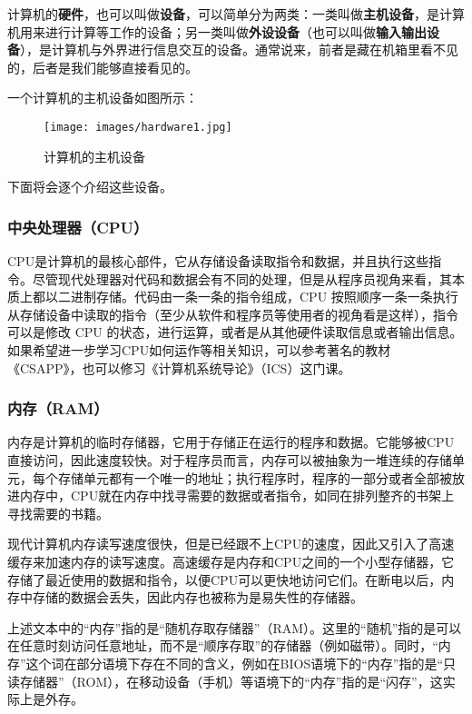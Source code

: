 \documentclass[../main.tex]{subfiles}
\begin{document}
计算机的\textbf{硬件}，也可以叫做\textbf{设备}，可以简单分为两类：一类叫做\textbf{主机设备}，是计算机用来进行计算等工作的设备；另一类叫做\textbf{外设设备}（也可以叫做\textbf{输入输出设备}），是计算机与外界进行信息交互的设备。通常说来，前者是藏在机箱里看不见的，后者是我们能够直接看见的。

一个计算机的主机设备如图所示：
\begin{figure}[htbp]
  \centering
  \texttt{[image: images/hardware1.jpg]}
  \caption{计算机的主机设备}
  \label{fig:computer-hardware}
\end{figure}

下面将会逐个介绍这些设备。

\subsubsection{中央处理器（CPU）}

CPU是计算机的最核心部件，它从存储设备读取指令和数据，并且执行这些指令。尽管现代处理器对代码和数据会有不同的处理，但是从程序员视角来看，其本质上都以二进制存储。代码由一条一条的指令组成，CPU 按照顺序一条一条执行从存储设备中读取的指令（至少从软件和程序员等使用者的视角看是这样），指令可以是修改 CPU 的状态，进行运算，或者是从其他硬件读取信息或者输出信息。如果希望进一步学习CPU如何运作等相关知识，可以参考著名的教材《CSAPP》，也可以修习《计算机系统导论》（ICS）这门课。

\subsubsection{内存（RAM）}

内存是计算机的临时存储器，它用于存储正在运行的程序和数据。它能够被CPU直接访问，因此速度较快。对于程序员而言，内存可以被抽象为一堆连续的存储单元，每个存储单元都有一个唯一的地址；执行程序时，程序的一部分或者全部被放进内存中，CPU就在内存中找寻需要的数据或者指令，如同在排列整齐的书架上寻找需要的书籍。

现代计算机内存读写速度很快，但是已经跟不上CPU的速度，因此又引入了高速缓存来加速内存的读写速度。高速缓存是内存和CPU之间的一个小型存储器，它存储了最近使用的数据和指令，以便CPU可以更快地访问它们。在断电以后，内存中存储的数据会丢失，因此内存也被称为是易失性的存储器。

\begin{tcolorbox}[title=说明]
  上述文本中的“内存”指的是“随机存取存储器”（RAM）。这里的“随机”指的是可以在任意时刻访问任意地址，而不是“顺序存取”的存储器（例如磁带）。同时，“内存”这个词在部分语境下存在不同的含义，例如在BIOS语境下的“内存”指的是“只读存储器”（ROM），在移动设备（手机）等语境下的“内存”指的是“闪存”，这实际上是外存。
\end{tcolorbox}
\end{document}
